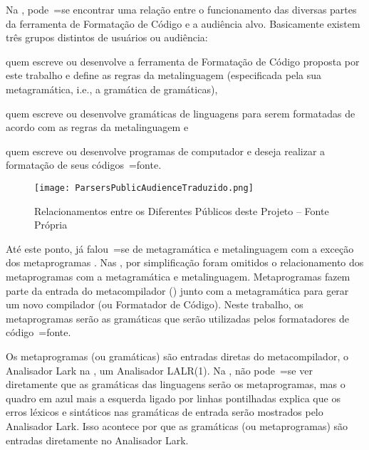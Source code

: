 Na ,
pode~=se encontrar uma relação entre o funcionamento das diversas partes da ferramenta de Formatação de Código e
a audiência alvo.
Basicamente existem três grupos distintos de usuários ou
audiência:
\begin{inparaenum}[1)]
\item quem escreve ou
desenvolve a ferramenta de Formatação de Código proposta por este trabalho e
define as regras da metalinguagem (especificada pela sua metagramática,
i.e.,
a gramática de gramáticas),
\item quem escreve ou
desenvolve gramáticas de linguagens para serem formatadas de acordo com as regras da metalinguagem e
\item quem escreve ou
desenvolve programas de computador e
deseja realizar a formatação de seus códigos~=fonte.
\end{inparaenum}%
\begin{figure}[h]
\centering
\texttt{[image: ParsersPublicAudienceTraduzido.png]}
\caption[Relacionamentos entre os Diferentes Públicos deste Projeto]{Relacionamentos entre os Diferentes Públicos deste Projeto -- Fonte Própria \cite{larkErrorRecovery}}
\label{ParsersPublicAudienceTraduzido}
\end{figure}

Até este ponto,
já falou~=se de metagramática e
metalinguagem com a exceção dos metaprogramas \cite{tradeoffsInMetaprogramming}.
Nas ,
por simplificação foram omitidos o relacionamento dos metaprogramas com a metagramática e
metalinguagem.
Metaprogramas fazem parte da entrada do metacompilador () junto com a metagramática para gerar um novo compilador (ou Formatador de Código).
Neste trabalho,
os metaprogramas serão as gramáticas que serão utilizadas pelos formatadores de código~=fonte.

Os metaprogramas (ou gramáticas) são entradas diretas do metacompilador,
o Analisador Lark na ,
um Analisador LALR(1).
Na ,
não pode~=se ver diretamente que as gramáticas das linguagens serão os metaprogramas,
mas o quadro em azul mais a esquerda ligado por linhas pontilhadas explica que os erros léxicos e
sintáticos nas gramáticas de entrada serão mostrados pelo Analisador Lark.
Isso acontece por que as gramáticas (ou metaprogramas) são entradas diretamente no Analisador Lark.


